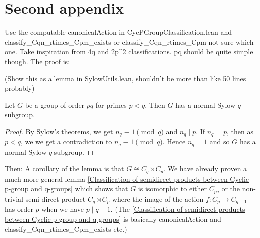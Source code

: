 \section{Second appendix}
\label{sec:appendix2}













Use the computable canonicalAction in CycPGroupClassification.lean and classify_Cqn_rtimes_Cpm_exists or classify_Cqn_rtimes_Cpm not sure which one. Take inspiration from 4q and 2p^2 classifications. pq should be quite simple though. The proof is:

(Show this as a lemma in SylowUtils.lean, shouldn't be more than like 50 lines probably)
\begin{lemma}
    Let $G$ be a group of order $pq$ for primes $p < q$. Then $G$ has a normal Sylow-$q$ subgroup.
\end{lemma}
\begin{proof}
    By Sylow's theorems, we get $n_q \equiv 1 \pmod q$ and $n_q \mid p$. If $n_q = p$, then as $p < q$, we we get a contradiction to $n_q \equiv 1 \pmod q$. Hence $n_q = 1$ and so $G$ has a normal Sylow-$q$ subgroup.
\end{proof}

Then: A corollary of the lemma is that $G \cong C_q \rtimes C_p$. We have already proven a much more general lemma \ref{Classification of semidirect products between Cyclic p-group and q-groups} which shows that $G$ is isomorphic to either $C_{pq}$ or the non-trivial semi-direct product $C_q \rtimes C_p$ where the image of the action $f : C_p \rightarrow C_{q - 1}$ has order $p$ when we have $p \mid q - 1$.
(The \ref{Classification of semidirect products between Cyclic p-group and q-groups} is basically canonicalAction and classify_Cqn_rtimes_Cpm_exists etc.)

